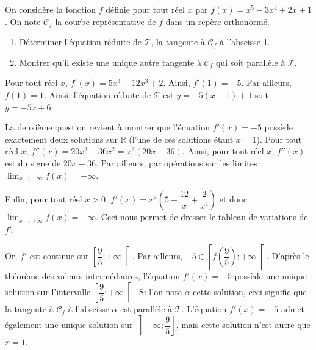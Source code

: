 \documentclass[11pt,fleqn, openany]{book} %
\begin{document}
\begin{exercise}[topic=cont03]On considère la fonction $f$ définie pour tout réel $x$ par $f(x)=x^5-3x^4+2x+1$. On note $\mathcal{C}_f$ la courbe représentative de $f$ dans un repère orthonormé.
\begin{enumerate}
\item Déterminer l'équation réduite de $\mathcal{T}$, la tangente à $\mathcal{C}_f$ à l'abscisse 1.
\item Montrer qu'il existe une unique autre tangente à $\mathcal{C}_f$ qui soit parallèle à $\mathcal{T}$. 
\end{enumerate}
\end{exercise}

\begin{solution}Pour tout réel $x$, $f'(x)=5x^4-12x^3+2$. Ainsi, $f'(1)=-5$. Par ailleurs, $f(1)=1$. Ainsi, l'équation réduite de $\mathcal{T}$ est $y=-5(x-1)+1$ soit $y=-5x+6$.

La deuxième question revient à montrer que l'équation $f'(x)=-5$ possède exactement deux solutions sur $\mathbb{R}$ (l'une de ces solutions étant $x=1$). Pour tout réel $x$, $f''(x)=20x^3-36x^2=x^2(20x-36)$. Ainsi, pour tout réel $x$, $f''(x)$ est du signe de $20x-36$. Par ailleurs, par opérations sur les limites $\displaystyle\lim_{x \to -\infty}f(x)=+\infty$. 

Enfin, pour tout réel $x>0$, $f'(x)=x^4\left(5-\dfrac{12}{x}+\dfrac{2}{x^4}\right)$ et donc$\displaystyle\lim_{x \to +\infty}f(x)=+\infty$. Ceci nous permet de dresser le tableau de variations de $f'$.

\begin{center}
\end{center}

Or, $f'$ est continue sur $\left[ \dfrac{9}{5} ; +\infty\right[$. Par ailleurs, $-5 \in \left[ f\left(\dfrac{9}{5}\right) ; +\infty\right[$. D'après le théorème des valeurs intermédiaires, l'équation $f'(x)=-5$ possède une unique solution sur l'intervalle $\left[ \dfrac{9}{5} ; +\infty \right[$. Si l'on note $\alpha$ cette solution, ceci signifie que la tangente à $\mathcal{C}_f$ à l'abscisse $\alpha$ est parallèle à $\mathcal{T}$. L'équation $f'(x)=-5$ admet également une unique solution sur $\left] - \infty; \dfrac{9}{5} \right]$, mais cette solution n'est autre que $x=1$.

\end{solution}
\end{document}
